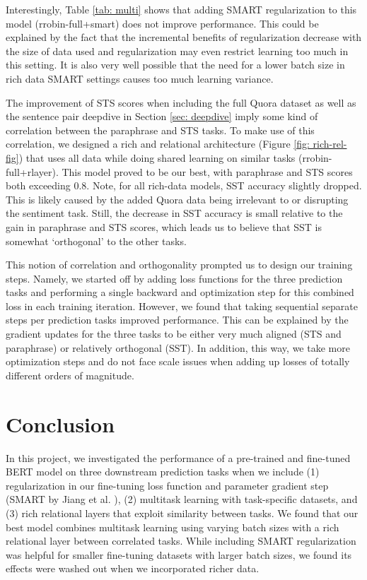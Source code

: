 \documentclass{article}
\begin{document}
Interestingly, Table \ref{tab: multi} shows that adding SMART regularization to this model (rrobin-full+smart) does not improve performance. This could be explained by the fact that the incremental benefits of regularization decrease with the size of data used and regularization may even restrict learning too much in this setting. It is also very well possible that the need for a lower batch size in rich data SMART settings causes too much learning variance.   

The improvement of STS scores when including the full Quora dataset as well as the sentence pair deepdive in Section \ref{sec: deepdive} imply some kind of correlation between the paraphrase and STS tasks. To make use of this correlation, we designed a rich and relational architecture (Figure \ref{fig: rich-rel-fig}) that uses all data while doing shared learning on similar tasks (rrobin-full+rlayer). This model proved to be our best, with paraphrase and STS scores both exceeding 0.8. Note, for all rich-data models, SST accuracy slightly dropped. This is likely caused by the added Quora data being irrelevant to or disrupting the sentiment task. Still, the decrease in SST accuracy is small relative to the gain in paraphrase and STS scores, which leads us to believe that SST is somewhat `orthogonal' to the other tasks. 
 
This notion of correlation and orthogonality prompted us to design our training steps. Namely, we started off by adding loss functions for the three prediction tasks and performing a single backward and optimization step for this combined loss in each training iteration. However, we found that taking sequential separate steps per prediction tasks improved performance. This can be explained by the gradient updates for the three tasks to be either very much aligned (STS and paraphrase) or relatively orthogonal (SST). In addition, this way, we take more optimization steps and do not face scale issues when adding up losses of totally different orders of magnitude.
\vspace{-0.2cm}
\section{Conclusion}
\label{sec: conclusion}
\vspace{-0.2cm}
In this project, we investigated the performance of a pre-trained and fine-tuned BERT model on three downstream prediction tasks when we include (1) regularization in our fine-tuning loss function and parameter gradient step (SMART by Jiang et al. \cite{smart}), (2) multitask learning with task-specific datasets, and (3) rich relational layers that exploit similarity between tasks. We found that our best model combines multitask learning using varying batch sizes with a rich relational layer between correlated tasks. While including SMART regularization was helpful for smaller fine-tuning datasets with larger batch sizes, we found its effects were washed out when we incorporated richer data.
\end{document}
